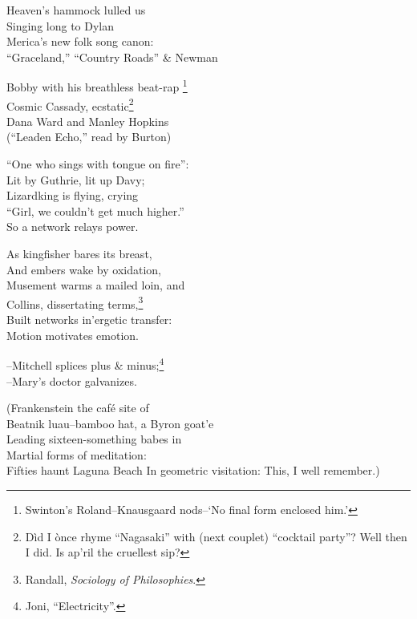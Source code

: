 % 
% 
% 
% 

Heaven's hammock lulled us \\
Singing long to Dylan \\
Merica's new folk song canon: \\
``Graceland,'' ``Country Roads'' \& Newman

Bobby with his breathless beat-rap
\footnote{Swinton's Roland--Knausgaard nods--`No final form enclosed him.'} \\
Cosmic Cassady, ecstatic\footnote{Dìd I ònce rhyme ``Nagasaki'' with (next couplet) ``cocktail party''? Well then I did. Is ap'ril the cruellest sip?} \\
Dana Ward and Manley Hopkins \\
(``Leaden Echo,'' read by Burton)

``One who sings with tongue on fire'': \\
Lit by Guthrie, lit up Davy;  \\
Lizardking is flying, crying \\
``Girl, we couldn't get much higher.'' \\
So a network relays power.

As kingfisher bares its breast, \\
And embers wake by oxidation, \\
Musement warms a mailed loin, and \\
Collins, dissertating terms,\footnote{Randall, \textit{Sociology of Philosophies}.} \\
Built networks in'ergetic transfer: \\
Motion motivates emotion.

--Mitchell splices plus \& minus;\footnote{Joni, ``Electricity''.} \\
--Mary's doctor galvanizes.

(Frankenstein the café site of \\
Beatnik luau--bamboo hat, a Byron goat'e \\
Leading sixteen-something babes in \\
Martial forms of meditation: \\
Fifties haunt Laguna Beach
In geometric visitation:
This, I well remember.)

